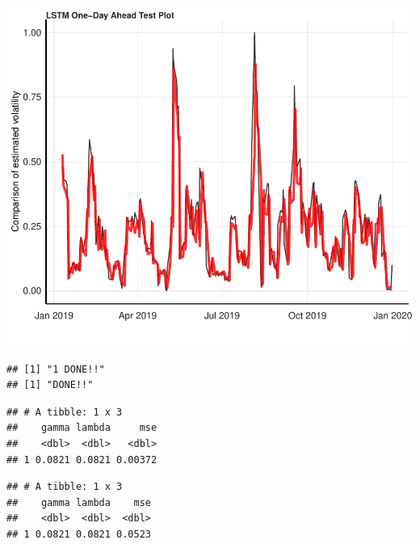 \documentclass[11pt,preprint, authoryear]{elsarticle}
\let\origfigure\figure
\let\endorigfigure\endfigure
\renewenvironment{figure}[1][2] {
    \expandafter\origfigure\expandafter[H]
} {
    \endorigfigure
}
\numberwithin{equation}{section}
\numberwithin{figure}{section}
\numberwithin{table}{section}
\begin{document}
\begin{figure}[H]

{\centering \includegraphics{Essay_files/figure-latex/plot_test-1} 

}

\caption{LSTM One-Day Ahead Test Forecast}\label{fig:plot_test}
\end{figure}

\begin{verbatim}
## [1] "1 DONE!!"
## [1] "DONE!!"
\end{verbatim}

\begin{verbatim}
## # A tibble: 1 x 3
##    gamma lambda     mse
##    <dbl>  <dbl>   <dbl>
## 1 0.0821 0.0821 0.00372
\end{verbatim}

\begin{verbatim}
## # A tibble: 1 x 3
##    gamma lambda    mse
##    <dbl>  <dbl>  <dbl>
## 1 0.0821 0.0821 0.0523
\end{verbatim}
\end{document}

